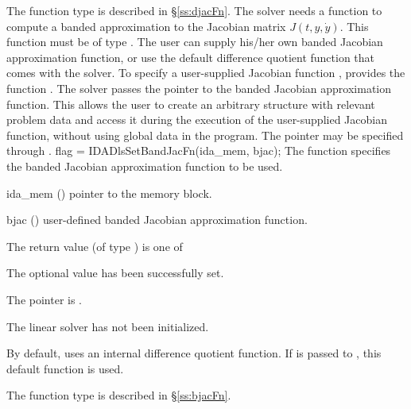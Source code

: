 {{  The function type  is described in \S\ref{ss:djacFn}.
}
The 
{\idaband} solver needs a function to compute a banded approximation to the
Jacobian matrix $J(t,y,\dot{y})$. This function must be of type . 
The user can supply his/her own banded Jacobian approximation function, 
or use the default difference quotient function
that comes with the {\idaband} solver.
To specify a user-supplied Jacobian function , {\idaband} provides
the function .
The {\idaband} solver passes the pointer 
to the banded Jacobian approximation function. This allows the user to
create an arbitrary structure with relevant problem data and access it
during the execution of the user-supplied Jacobian function, without using
global data in the program.  The pointer  may be 
specified through .
{
  flag = IDADlsSetBandJacFn(ida\_mem, bjac);
}
{
  The function  specifies the banded Jacobian
  approximation function to be used.
}
{
  \begin{args}
  \item[ida\_mem] ()
    pointer to the {\idas} memory block.
  \item[bjac] ()
    user-defined banded Jacobian approximation function.
  \end{args}
}
{
  The return value  (of type ) is one of
  \begin{args}
  \item[\Id{IDADLS\_SUCCESS}] 
    The optional value has been successfully set.
  \item[\Id{IDADLS\_MEM\_NULL}]
    The  pointer is .
  \item[\Id{IDADLS\_LMEM\_NULL}]
    The {\idaband} linear solver has not been initialized.
  \end{args}
}
{
  By default, {\idaband} uses an internal difference quotient function.
  If  is passed to , this default function is used.

  The function type  is described in \S\ref{ss:bjacFn}.
}

}
